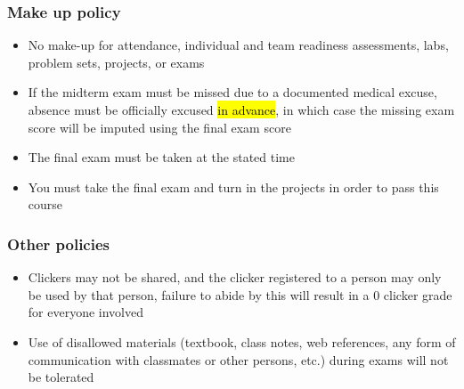 \documentclass[11pt,containsverbatim,handout,xcolor=xelatex,dvipsnames,table]{beamer}
\begin{document}
\begin{frame}
\frametitle{Make up policy}

\begin{itemize}

\item No make-up for attendance, individual and team readiness assessments, labs, problem sets, projects, or exams

\item If the midterm exam must be missed due to a documented medical excuse, absence must be officially excused \hl{in advance}, in which case the missing exam score will be imputed using the final exam score

\item The final exam must be taken at the stated time

\item You must take the final exam and turn in the projects in order to pass this course

\end{itemize}

\end{frame}


\begin{frame}
\frametitle{Other policies}

\begin{itemize}

\item Clickers may not be shared, and the clicker registered to a person may only be used by that person, failure to abide by this will result in a 0 clicker grade for everyone involved

\item Use of disallowed materials (textbook, class notes, web references, any form of communication with classmates or other persons, etc.) during exams will not be tolerated

\end{itemize}

\end{frame}

\end{document}
